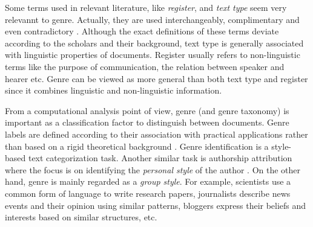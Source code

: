 Some terms used in relevant literature, like \textit{register}, and \textit{text type} seem very relevannt to genre. Actually, they are used interchangeably, complimentary and even contradictory \parencite{melissourgou2017genre}. Although the exact definitions of these terms deviate according to the scholars and their background, text type is generally associated with linguistic properties of documents. Register usually refers to non-linguistic terms like the purpose of communication, the relation between speaker and hearer etc. Genre can be viewed as more general than both text type and register since it combines linguistic and non-linguistic information. 




From a computational analysis point of view, genre (and genre taxonomy) is important as a classification factor to distinguish between documents. Genre labels are defined according to their association with practical applications rather than based on a rigid theoretical background \parencite{kanaris2009learning,meyer2004genre,santini2007automatic}. Genre identification is a style-based text categorization task. Another similar task is authorship attribution where the focus is on identifying the \textit{personal style} of the author \parencite{stamatatos2009survey,koppel2011authorship,koppel2014determining}. On the other hand, genre is mainly regarded as a \textit{group style}. For example, scientists use a common form of language to write research papers, journalists describe news events and their opinion using similar patterns, bloggers express their beliefs and interests based on similar structures, etc.

